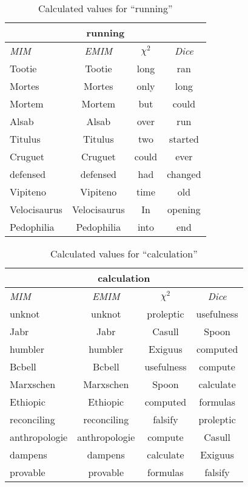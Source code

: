 \begin{table}[h!]
\centering
\begin{tabular}{ l | c | c | c }
\hline
\multicolumn{4}{c}{running}\\
\hline
\textit{MIM} & \textit{EMIM} & \textit{\(\chi^2\)} & \textit{Dice}\\
\hline
Tootie & Tootie & long & ran\\
Mortes & Mortes & only & long\\
Mortem & Mortem & but & could\\
Alsab & Alsab & over & run\\
Titulus & Titulus & two & started\\
Cruguet & Cruguet & could & ever\\
defensed & defensed & had & changed\\
Vipiteno & Vipiteno & time & old\\
Velocisaurus & Velocisaurus & In & opening\\
Pedophilia & Pedophilia & into & end\\
\hline
\end{tabular}
\caption{Calculated values for ``running''}
\label{tab:words}
\end{table}
\begin{table}[h!]
\centering
\begin{tabular}{ l | c | c | c }
\hline
\multicolumn{4}{c}{calculation}\\
\hline
\textit{MIM} & \textit{EMIM} & \textit{\(\chi^2\)} & \textit{Dice}\\
\hline
unknot & unknot & proleptic & usefulness\\
Jabr & Jabr & Casull & Spoon\\
humbler & humbler & Exiguus & computed\\
Bcbell & Bcbell & usefulness & compute\\
Marxschen & Marxschen & Spoon & calculate\\
Ethiopic & Ethiopic & computed & formulas\\
reconciling & reconciling & falsify & proleptic\\
anthropologie & anthropologie & compute & Casull\\
dampens & dampens & calculate & Exiguus\\
provable & provable & formulas & falsify\\
\hline
\end{tabular}
\caption{Calculated values for ``calculation''}
\label{tab:words}
\end{table}
